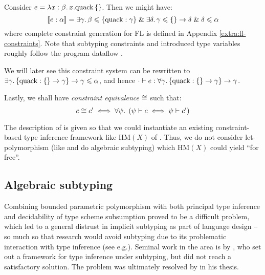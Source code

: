 \begin{example}
    Consider $e = \lambda {x: \beta} \ldotp {x}{.}{\mathrm{quack}}\,\{\}$. Then we might have:
    $$ \denot{e : \alpha} = \exists \gamma \ldotp \beta \sub \flrec{\mathrm{quack}: \gamma} \und \exists \delta \ldotp \gamma \sub \flrec{} \to \delta \und \delta \sub \alpha $$
    where complete constraint generation for FL is defined in Appendix \ref{extra:fl-constraints}. Note that subtyping constraints and introduced type variables roughly follow the program dataflow \cite{mlsub}.

    We will later see this constraint system can be rewritten to $\exists \gamma \ldotp \flrec{\mathrm{quack} : \flrec{} \to \gamma} \to \gamma \sub \alpha$, and hence $\cdot \vdash e : \forall \gamma \ldotp \flrec{\mathrm{quack} : \flrec{} \to \gamma} \to \gamma$.
\end{example}

Lastly, we shall have \emph{constraint equivalence} $\cong$ such that:
$$ c \cong c' \iff  \forall \psi \ldotp \; (\psi \vdash c \iff \psi \vdash c') $$

The description of \inference{} is given so that we could instantiate an existing constraint-based type inference framework like $\mathrm{HM}(X)$ of \textcite{constraint-based-hm}. Thus, we do not consider let-polymorphism (like \textcite{dolan-thesis} and \textcite{simple-sub} do algebraic subtyping) which $\mathrm{HM}(X)$ could yield \enquote{for free}.


\subsection{Algebraic subtyping}

Combining bounded parametric polymorphism with both principal type inference and decidability of type scheme subsumption proved to be a difficult problem, which led to a general distrust in implicit subtyping as part of language design \cite{mlstruct} -- so much so that research would avoid subtyping due to its problematic interaction with type inference (see e.g.\@ \cite[Section~3.5]{linear-haskell}). Seminal work in the area is by \textcite{pottier-thesis}, who set out a framework for type inference under subtyping, but did not reach a satisfactory solution. The problem was ultimately resolved by \textcite{dolan-thesis} in his thesis.

